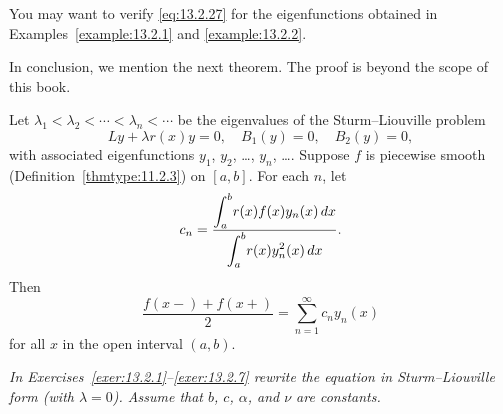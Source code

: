You may want to verify \eqref{eq:13.2.27} for the eigenfunctions obtained in
Examples~\ref{example:13.2.1} and \ref{example:13.2.2}.

In conclusion, we mention the next theorem. The proof is beyond the scope of this book.

\begin{theorem}
  \color{blue}
  \label{thmtype:13.2.7} Let $\lambda_{1}<\lambda_{2}<\cdots<\lambda_{n}<\cdots$ be the eigenvalues
  of the Sturm--Liouville problem
  \[
    Ly+\lambda r(x)y=0,\quad B_{1}(y)=0,\quad B_{2}(y)=0,
  \]
  with associated eigenfunctions $y_{1}$, $y_{2}$, \dots, $y_{n}$, \dots. Suppose $f$ is piecewise
  smooth (Definition~\ref{thmtype:11.2.3}) on $[a,b]$. For each $n$, let
  \[
    c_{n}=\frac{\displaystyle{\int_{a}^{b}}r(x)f(x)y_{n}(x)\,dx}{\displaystyle{\int_{a}^{b}}r(x)y_{n}^{2}(x)\,dx}.
  \]
  Then
  \[
    \frac{f(x-)+f(x+)}{2}=\sum_{n=1}^{\infty}c_{n}y_{n}(x)
  \]
  for all $x$ in the open interval $(a,b)$.
\end{theorem}

\exercises

\emph{In Exercises~\ref{exer:13.2.1}--\ref{exer:13.2.7} rewrite the equation in Sturm--Liouville
form (with $\lambda=0$). Assume that $b$, $c$, $\alpha$, and $\nu$ are constants.}

